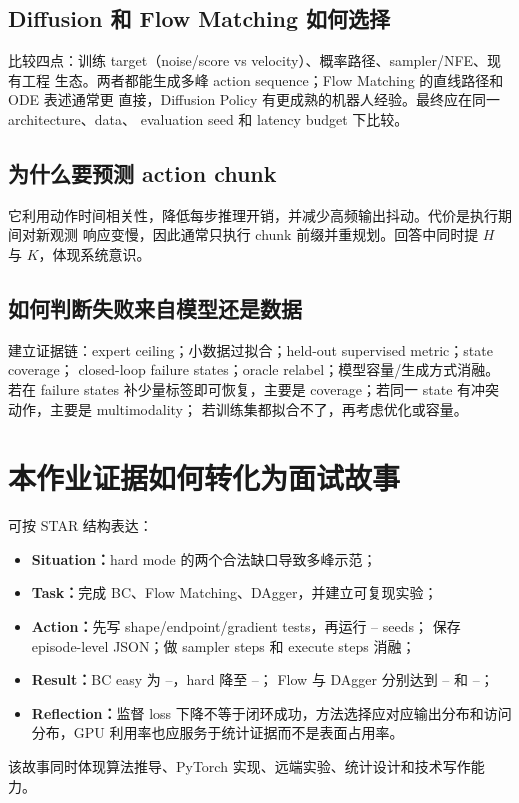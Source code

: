 \documentclass[10pt,twocolumn,a4paper]{ctexart}
\providecommand{\BCEasyMean}{--}
\providecommand{\BCHardMean}{--}
\providecommand{\FlowHardMean}{--}
\providecommand{\DaggerHardMean}{--}
\providecommand{\NumSeeds}{--}
\begin{document}
\subsection{Diffusion 和 Flow Matching 如何选择}
比较四点：训练 target（noise/score vs velocity）、概率路径、sampler/NFE、现有工程
生态。两者都能生成多峰 action sequence；Flow Matching 的直线路径和 ODE 表述通常更
直接，Diffusion Policy 有更成熟的机器人经验。最终应在同一 architecture、data、
evaluation seed 和 latency budget 下比较。

\subsection{为什么要预测 action chunk}
它利用动作时间相关性，降低每步推理开销，并减少高频输出抖动。代价是执行期间对新观测
响应变慢，因此通常只执行 chunk 前缀并重规划。回答中同时提 $H$ 与 $K$，体现系统意识。

\subsection{如何判断失败来自模型还是数据}
建立证据链：expert ceiling；小数据过拟合；held-out supervised metric；state coverage；
closed-loop failure states；oracle relabel；模型容量/生成方式消融。若在 failure states
补少量标签即可恢复，主要是 coverage；若同一 state 有冲突动作，主要是 multimodality；
若训练集都拟合不了，再考虑优化或容量。

\section{本作业证据如何转化为面试故事}
可按 STAR 结构表达：
\begin{itemize}
  \item \textbf{Situation：}hard mode 的两个合法缺口导致多峰示范；
  \item \textbf{Task：}完成 BC、Flow Matching、DAgger，并建立可复现实验；
  \item \textbf{Action：}先写 shape/endpoint/gradient tests，再运行 \NumSeeds{} seeds；
  保存 episode-level JSON；做 sampler steps 和 execute steps 消融；
  \item \textbf{Result：}BC easy 为 \BCEasyMean{}，hard 降至 \BCHardMean{}；
  Flow 与 DAgger 分别达到 \FlowHardMean{} 和 \DaggerHardMean{}；
  \item \textbf{Reflection：}监督 loss 下降不等于闭环成功，方法选择应对应输出分布和访问
  分布，GPU 利用率也应服务于统计证据而不是表面占用率。
\end{itemize}
该故事同时体现算法推导、PyTorch 实现、远端实验、统计设计和技术写作能力。
\end{document}
